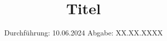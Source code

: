 

\subject{Versuch V47}
\title{Titel}
\date{%
  Durchführung: 10.06.2024
  \hspace{3em}
  Abgabe: XX.XX.XXXX
}



\maketitle
\thispagestyle{empty}
\tableofcontents
\newpage

%
%



\printbibliography



